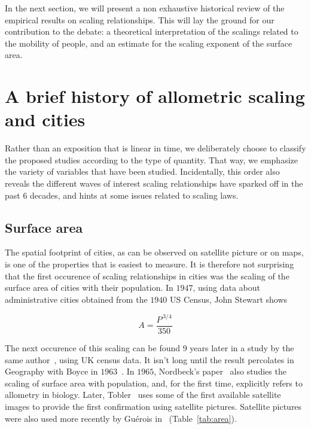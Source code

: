 In the next section, we will present a non exhaustive historical review of the
empirical results on scaling relationships. This will lay the ground for our contribution to the
debate: a theoretical interpretation of the scalings related to the mobility of
people, and an estimate for the scaling exponent of the surface area.  



\section{A brief history of allometric scaling and cities}
\label{sec:a_brief_history_of_allometric_scaling_and_cities} 

Rather than an exposition that is linear in time, we deliberately choose to
classify the proposed studies according to the type of quantity. That way, we  
emphasize the variety of variables that have been studied. Incidentally, this
order also reveals the different waves of interest scaling relationships have
sparked off in the past $6$ decades, and hints at some issues related to scaling laws.

\subsection{Surface area}
\label{sub:surface_area}

The spatial footprint of cities, as can be observed on satellite picture or on
maps, is one of the properties that is easiest to measure. It is therefore not
surprising that the first occurence of scaling relationships in cities was
the scaling of the surface area of cities with their population. In $1947$,
using data about administrative cities obtained from the $1940$ US Census, John
Stewart shows

\begin{equation}
    A = \frac{P^{\,3/4}}{350}
\end{equation}

The next occurence of this scaling can be found $9$ years later in a study by
the same author~\cite{Stewart:1958}, using UK census data. It isn't
long until the result percolates in Geography with Boyce in $1963$~\cite{Boyce:1963}.
In $1965$, Nordbeck's paper~\cite{Nordbeck:1965} also studies the scaling of surface area
with population, and, for the first time, explicitly refers to allometry in
biology. Later, Tobler~\cite{Tobler:1969} uses some of the first available
satellite images to provide the first confirmation using satellite pictures.
Satellite pictures were also used more recently by Gu\'erois
in~\cite{Guerois:2003} (Table~\ref{tab:area}).\\

